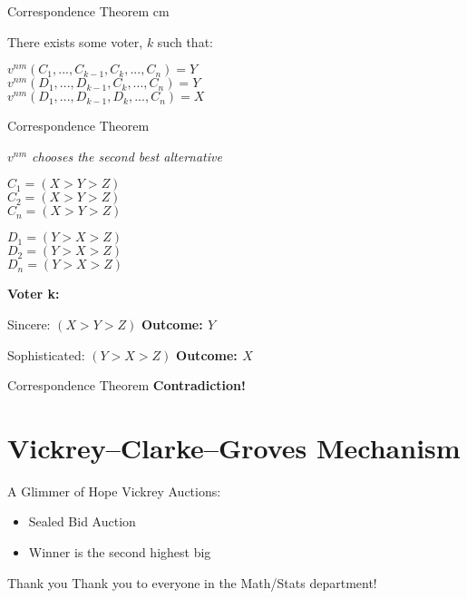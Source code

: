 \documentclass{beamer}
\begin{document}
\begin{frame}{Correspondence Theorem}
     cm

\Large    There exists some voter, $k$ such that:

    \vskip 0.25cm

    \center $v^{nm}(C_1, ... , C_{k-1}, C_k, ... , C_n) = Y$ \\ 
    $v^{nm}(D_1, ... , D_{k-1}, C_k, ... , C_n) = Y$ \\
    $v^{nm}(D_1, ... , D_{k-1}, D_k, ... , C_n) = X$
\end{frame}

\begin{frame}{Correspondence Theorem}
    \begin{example}

    \emph{$v^{nm}$ chooses the second best alternative}
    \begin{multicols}{2} %
        $C_1 = (X > Y > Z)$ \\
        $C_2 = (X > Y > Z)$ \\
        $C_n = (X > Y > Z)$

        $D_1 = (Y > X > Z)$ \\
        $D_2 = (Y > X > Z)$ \\
        $D_n = (Y > X > Z)$
    \end{multicols}

\vskip 1cm

    \textbf{Voter k:}

    \begin{multicols}{2}
    Sincere: $(X > Y > Z)$
    \textbf{Outcome: $Y$}

    Sophisticated: $(Y > X > Z)$
    \textbf{Outcome: $X$}
    \end{multicols}
    \end{example}
\end{frame}

\begin{frame}{Correspondence Theorem}
    \Huge \center \textbf{Contradiction!}
\end{frame}

\section{Vickrey–Clarke–Groves Mechanism}

\begin{frame}{A Glimmer of Hope}
\Large Vickrey Auctions:

\vskip 0.5cm

\Large
\begin{itemize}
    \item Sealed Bid Auction
    \item Winner is the second highest big
\end{itemize}



\end{frame}


\begin{frame}{Thank you}
    \Large Thank you to everyone in the Math/Stats department!
\end{frame}
\end{document}
